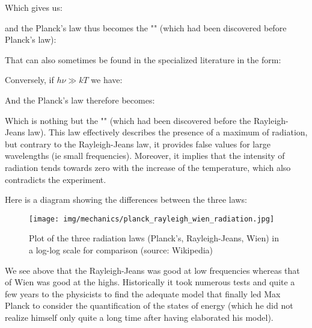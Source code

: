 	Which gives us:
	
	and the Planck's law thus becomes the "" (which had been discovered before Planck's law):
	
	That can also sometimes be found in the specialized literature in the form:
	
	Conversely, if $h\nu \gg kT$ we have:
	
	And the Planck's law therefore becomes:
	
	Which is nothing but the "" (which had been discovered before the Rayleigh-Jeans law). This law effectively describes the presence of a maximum of radiation, but contrary to the Rayleigh-Jeans law, it provides false values for large wavelengths (ie small frequencies). Moreover, it implies that the intensity of radiation tends towards zero with the increase of the temperature, which also contradicts the experiment.

	Here is a diagram showing the differences between the three laws:
	\begin{figure}[H]
		\centering
		\texttt{[image: img/mechanics/planck\_rayleigh\_wien\_radiation.jpg]}
		\caption{Plot of the three radiation laws (Planck's, Rayleigh-Jeans, Wien) in a log-log scale for comparison (source: Wikipedia)}
	\end{figure}
	We see above that the Rayleigh-Jeans was good at low frequencies whereas that of Wien was good at the highs. Historically it took numerous tests and quite a few years to the physicists to find the adequate model that finally led Max Planck to consider the quantification of the states of energy (which he did not realize himself only quite a long time after having elaborated his model).
	
